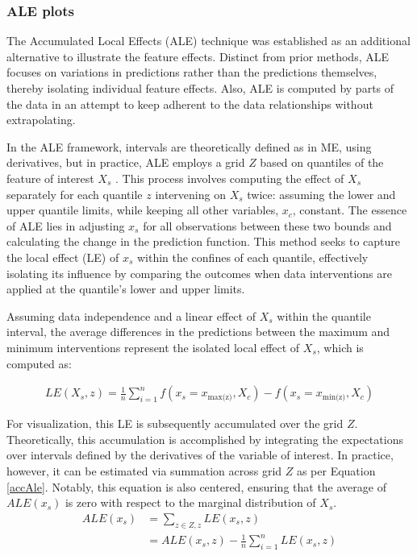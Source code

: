 \subsubsection{ALE plots}

The Accumulated Local Effects (ALE) technique was established as an additional alternative to illustrate the feature effects. Distinct from prior methods, \gls{ALE} focuses on variations in predictions rather than the predictions themselves, thereby isolating individual feature effects. Also, \gls{ALE} is computed by parts of the data in an attempt to keep adherent to the data relationships without extrapolating. 

In the \gls{ALE} framework, intervals are theoretically defined as in \gls{ME}, using derivatives, but in practice, \gls{ALE} employs a grid \(Z\) based on quantiles of the feature of interest $X_s$ .  This process involves computing the effect of $X_s$ separately for each quantile $z$ intervening on $X_s$ twice: assuming the lower and upper quantile limits, while keeping all other variables, $x_c$, constant. The essence of \gls{ALE} lies in adjusting $x_s$ for all observations between these two bounds and calculating the change in the prediction function. This method seeks to capture the local effect (LE) of $x_s$ within the confines of each quantile, effectively isolating its influence by comparing the outcomes when data interventions are applied at the quantile's lower and upper limits.

Assuming data independence and a linear effect of $X_s$ within the quantile interval, the average differences in the predictions between the maximum and minimum interventions represent the isolated local effect of $X_s$, which is computed as:

\begin{equation}
\begin{aligned}
LE({X_s, z}) = \frac{1}{n}\sum_{i=1}^{n} f(x_s = x_{\text{max(z)}}, X_c) - f(x_s = x_{\text{min(z)}}, X_c)
\end{aligned}
\label{accAle}
\end{equation}


For visualization, this LE is subsequently accumulated over the grid $Z$. Theoretically, this accumulation is accomplished by integrating the expectations over intervals defined by the derivatives of the variable of interest. In practice, however, it can be estimated via summation across grid $Z$ as per Equation \ref{accAle}. Notably, this equation is also centered, ensuring that the average of $ALE(x_s)$ is zero with respect to the marginal distribution of $X_s$. 
\begin{equation}
\begin{aligned}
ALE(x_s) &= \sum_{{z \in Z, z}} LE(x_s, z) \\
&= ALE(x_s,z) - \frac{1}{n}\sum_{i=1}^{n} LE(x_s,z)
\end{aligned}
\label{centerAle}
\end{equation}

